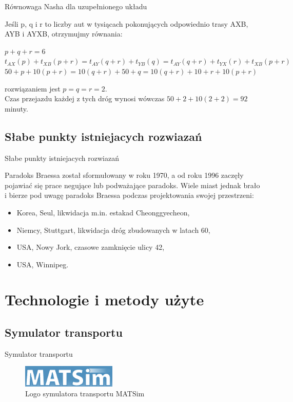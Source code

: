 \documentclass{beamer}
\begin{document}
\begin{frame}{Równowaga Nasha dla uzupełnionego układu\cite{braess}} 

Jeśli p, q i r to liczby aut w tysiącach pokonujących odpowiednio trasy AXB, AYB i AYXB, otrzymujmy równania:

\begin{center}
$p+q+r = 6 $\\
$t_{AX}(p)+t_{XB}(p+r) = t_{AY}(q+r) + t_{YB}(q) = t_{AY}(q+r)+t_{YX}(r)+t_{XB}(p+r)$
\newline\\
$50+p+10(p+r) = 10(q+r)+50+q = 10(q+r)+ 10 + r + 10(p+r)$
\end{center}
rozwiązaniem jest $p=q=r=2$.\\
Czas przejazdu każdej z tych dróg wynosi wówczas $50+2+10(2+2)=92$ minuty.
\end{frame}


\subsection{Słabe punkty istniejacych rozwiazań}
\begin{frame}{Słabe punkty istniejacych rozwiazań} 

Paradoks Braessa został sformułowany w roku 1970,
a od roku 1996 zaczęły pojawiać się prace negujące lub podważające paradoks\cite{newinsights}.
Wiele miast jednak brało i bierze pod uwagę paradoks Braessa podczas projektowania swojej przestrzeni:

\begin{itemize}
\item Korea, Seul, likwidacja m.in. estakad Cheonggyecheon,
\item Niemcy, Stuttgart, likwidacja dróg zbudowanych w latach 60,
\item USA, Nowy Jork, czasowe zamknięcie ulicy 42,
\item USA, Winnipeg.\cite{urban}
\end{itemize}  

\end{frame}


\section{Technologie i metody użyte}
\subsection{Symulator transportu}
\begin{frame}{Symulator transportu} 

	\begin{figure}[b]
	\includegraphics[width=0.40\textwidth]{img/matsim}
	\caption{Logo symulatora transportu MATSim \cite{matsim}} 
	\end{figure}

\end{frame}
\end{document}
